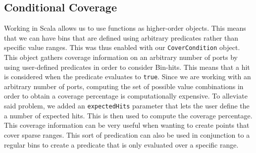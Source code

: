 \documentclass[conference]{IEEEtran}
\begin{document}
\subsection{Conditional Coverage}
Working in Scala allows us to use functions as higher-order objects. 
This means that we can have bins that are defined using arbitrary predicates rather than specific value ranges. 
This was thus enabled with our \texttt{CoverCondition} object.
This object gathers coverage information on an arbitrary number of ports by using user-defined predicates in order to consider Bin-hits.
This means that a hit is considered when the predicate evaluates to \texttt{true}. 
Since we are working with an arbitrary number of ports, computing the set of possible value combinations in order to obtain a coverage percentage is computationally expensive.
To alleviate said problem, we added an \texttt{expectedHits} parameter that lets the user define the a number of expected hits.
This is then used to compute the coverage percentage.
This coverage information can be very useful when wanting to create points that cover sparse ranges.   
This sort of predication can also be used in conjunction to a regular bins to create a predicate that is only evaluated over a specific range.  
\end{document}
